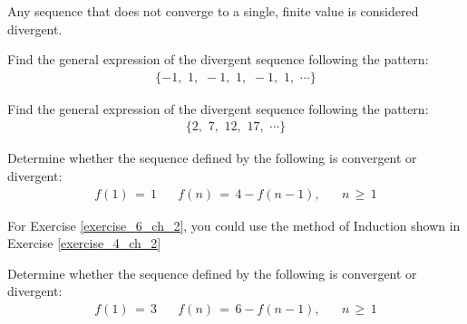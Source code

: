 \begin{note}
Any sequence that does not converge to a single, finite value is considered divergent.
\end{note}

\begin{exercise}
Find the general expression of the divergent sequence following the pattern:
\begin{align*}
    \{-1, \hspace{4pt} 1, \hspace{4pt} -1, \hspace{4pt} 1, \hspace{4pt} -1, \hspace{4pt} 1, \hspace{4pt} \cdots\}
\end{align*}
\end{exercise}

\begin{exercise}
Find the general expression of the divergent sequence following the pattern:
\begin{align*}
    \{2, \hspace{4pt} 7, \hspace{4pt} 12, \hspace{4pt} 17, \hspace{4pt} \cdots\}
\end{align*}
\end{exercise}

\begin{exercise}\label{exercise_6_ch_2}
Determine whether the sequence defined by the following is convergent or divergent:
\begin{align*}
    f(1) \hspace{2pt} = \hspace{2pt} 1 \hspace{20pt} f(n) \hspace{2pt} = \hspace{2pt} 4 - f(n-1), \hspace{20pt} n \hspace{2pt} \geq \hspace{2pt} 1
\end{align*}
\end{exercise}

For Exercise \ref{exercise_6_ch_2}, you could use the method of Induction shown in Exercise \ref{exercise_4_ch_2}

\begin{exercise}
Determine whether the sequence defined by the following is convergent or divergent:
\begin{align*}
    f(1) \hspace{2pt} = \hspace{2pt} 3 \hspace{20pt} f(n) \hspace{2pt} = \hspace{2pt} 6 - f(n-1), \hspace{20pt} n \hspace{2pt} \geq \hspace{2pt} 1
\end{align*}
\end{exercise}




